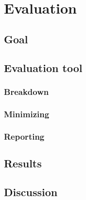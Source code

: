\chapter{Evaluation}\label{C:eval}
%

\section{Goal}

\section{Evaluation tool}

\subsection{Breakdown}

\subsection{Minimizing}

\subsection{Reporting}

\section{Results}

\section{Discussion}
